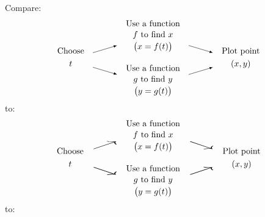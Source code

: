 \documentclass[10pt]{book}
\begin{document}
Compare: %
\[
\begin{gathered}\text{Choose}\\t\end{gathered}\quad
\tikz[>=latex,baseline=(current bounding box.center)]{\draw[->](0,.3)--(1,.6);\draw[->](0,-.3)--(1,-.6);}\quad
{\addtolength{\jot}{-.5ex}
\begin{gathered}
\text{Use a function}\\f\text{ to find }x\\\bigl(x=f(t)\bigr)\\\mbox{}\\
\text{Use a function}\\g\text{ to find }y\\\bigl(y=g(t)\bigr)
\end{gathered}
}\quad
\tikz[>=latex,baseline=(current bounding box.center)]{\draw[->](0,.6)--(1,.3);\draw[->](0,-.6)--(1,-.3);}\quad
\begin{gathered}\text{Plot point}\\(x,y)\end{gathered}
\]
to:
\[
\begin{gathered}\text{Choose}\\t\end{gathered}\quad
\begin{gathered}\scalebox{3}[1]{$\nearrow$}\\\\\scalebox{3}[1]{$\searrow$}\end{gathered}\quad
{\addtolength{\jot}{-.5ex}
\begin{gathered}
\text{Use a function}\\f\text{ to find }x\\\bigl(x=f(t)\bigr)\\\\
\text{Use a function}\\g\text{ to find }y\\\bigl(y=g(t)\bigr)
\end{gathered}
}\quad
\begin{gathered}\scalebox{3}[1]{$\searrow$}\\\\\scalebox{3}[1]{$\nearrow$}\end{gathered}\quad
\begin{gathered}\text{Plot point}\\(x,y)\end{gathered}
\]
to:
\end{document}
